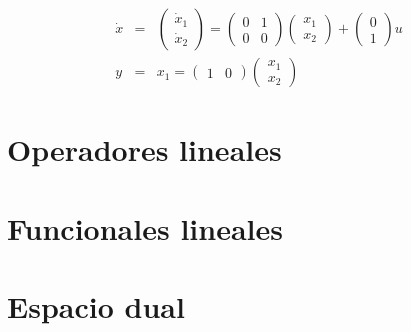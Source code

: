 		\begin{eqnarray*}
			\dot{x} & = &
			\begin{pmatrix}
				\dot{x}_1 \\
				\dot{x}_2
			\end{pmatrix} =
			\begin{pmatrix}
				0 & 1 \\
				0 & 0
			\end{pmatrix}
			\begin{pmatrix}
				x_1 \\
				x_2
			\end{pmatrix} +
			\begin{pmatrix}
				0 \\
				1
			\end{pmatrix} u \\
			y & = & x_1 =
			\begin{pmatrix}
				1 & 0
			\end{pmatrix}
			\begin{pmatrix}
				x_1 \\
				x_2
			\end{pmatrix}
		\end{eqnarray*}


\section{Operadores lineales}


\section{Funcionales lineales}


\section{Espacio dual}


